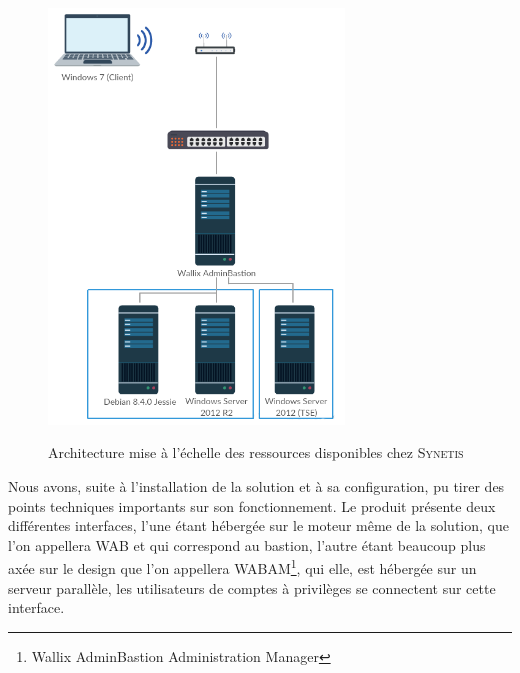 \begin{figure}[!ht]
    \center
    \includegraphics[width=0.7\textwidth]{./images/PoC_archi_reelle.png}
    \label{fig:archi_reelle}
    \caption{Architecture mise à l'échelle des ressources disponibles chez \textsc{Synetis}}
\end{figure}

Nous avons, suite à l'installation de la solution et à sa configuration, pu tirer des points techniques importants sur son fonctionnement. Le produit présente deux différentes interfaces, l'une étant hébergée sur le moteur même de la solution, que l'on appellera WAB et qui correspond au \gls{bastion}, l'autre étant beaucoup plus axée sur le design que l'on appellera WABAM\footnote{Wallix AdminBastion Administration Manager}, qui elle, est hébergée sur un serveur parallèle, les utilisateurs de comptes à privilèges se connectent sur cette interface.\\

